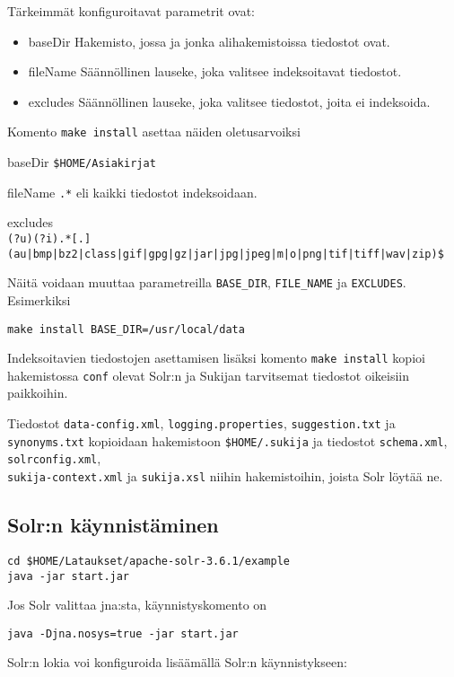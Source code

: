 \documentclass[12pt,a4paper]{scrartcl}
\begin{document}
Tärkeimmät konfiguroitavat parametrit ovat:

\begin{itemize}
\item baseDir
Hakemisto, jossa ja jonka alihakemistoissa tiedostot ovat.

\item fileName
Säännöllinen lauseke, joka valitsee indeksoitavat tiedostot.

\item excludes
Säännöllinen lauseke, joka valitsee tiedostot, joita ei indeksoida.
\end{itemize}

Komento \verb|make install| asettaa näiden oletusarvoiksi

baseDir \verb|$HOME/Asiakirjat|

fileName \verb|.*| eli kaikki tiedostot indeksoidaan.

excludes \\
{\footnotesize \verb+(?u)(?i).*[.](au|bmp|bz2|class|gif|gpg|gz|jar|jpg|jpeg|m|o|png|tif|tiff|wav|zip)$+}


Näitä voidaan muuttaa parametreilla \verb|BASE_DIR|,
\verb|FILE_NAME| ja
\verb|EXCLUDES|. Esimerkiksi

\verb|make install BASE_DIR=/usr/local/data|

Indeksoitavien tiedostojen asettamisen lisäksi komento
\verb=make install= kopioi hakemistossa \verb=conf= olevat Solr:n ja
Sukijan tarvitsemat tiedostot oikeisiin paikkoihin.

Tiedostot
\verb=data-config.xml=,
\verb=logging.properties=,
\verb=suggestion.txt= ja
\verb=synonyms.txt=
kopioidaan hakemistoon \verb=$HOME/.sukija=
ja tiedostot
\verb=schema.xml=,
\verb=solrconfig.xml=, \\
\verb=sukija-context.xml= ja
\verb=sukija.xsl=
niihin hakemistoihin, joista Solr löytää ne.


\subsection*{Solr:n käynnistäminen}

\begin{verbatim}
cd $HOME/Lataukset/apache-solr-3.6.1/example
java -jar start.jar
\end{verbatim}

Jos Solr valittaa jna:sta, käynnistyskomento on

\verb|java -Djna.nosys=true -jar start.jar|

Solr:n lokia voi konfiguroida lisäämällä Solr:n käynnistykseen:
\end{document}

